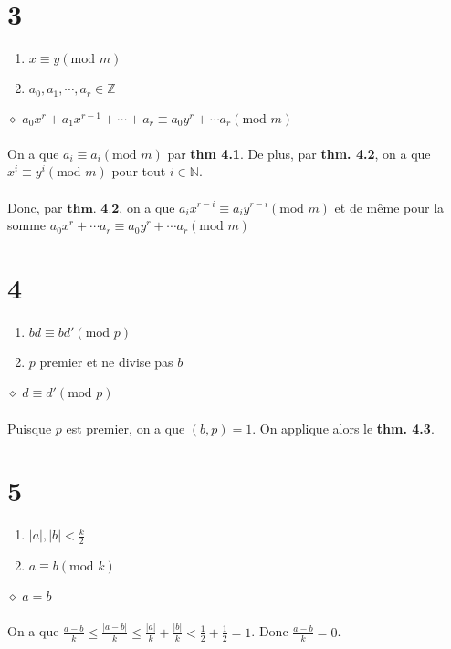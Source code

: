 \documentclass[a4paper,10pt]{article}
\begin{document}
\section*{3}
\begin{enumerate}
	\item $x \equiv y (\text{mod } m)$
	\item $a_0, a_1, \cdots, a_r \in \mathbb{Z}$
\end{enumerate}
$\diamond$ \textbf{$a_0x^r + a_1 x^{r-1} + \cdots + a_r \equiv a_0 y^r + \cdots a_r (\text{mod }m)$}
\\
\\
On a que $a_i \equiv a_i (\text{mod } m)$ par \textbf{thm 4.1}. De plus, par \textbf{thm. 4.2}, on a que $x^i \equiv y^i (\text{mod } m)$ pour tout $i \in \mathbb{N}$.
\\
\\
Donc, par $\textbf{thm. 4.2}$, on a que $a_i x^{r-i} \equiv a_i y^{r-i}(\text{mod } m )$ et de même pour la somme $a_0 x^r + \cdots a_r \equiv a_0 y^r + \cdots a_r (\text{mod }m)$

\section*{4}
\begin{enumerate}
	\item $bd \equiv bd' (\text{mod } p)$
	\item $p$ premier et ne divise pas $b$
\end{enumerate}
$\diamond$ \textbf{$d \equiv d' (\text{mod }p)$}
\\
\\
Puisque $p$ est premier, on a que $(b,p) = 1$. On applique alors le \textbf{thm. 4.3}.

\section*{5}
\begin{enumerate}
	\item $|a|, |b| < \frac{k}{2}$
	\item $a \equiv b(\text{mod } k)$
\end{enumerate}
$\diamond$ \textbf{$a = b$}
\\
\\
On a que $\frac{a-b}{k} \leq \frac{|a-b|}{k} \leq \frac{|a|}{k} + \frac{|b|}{k} < \frac{1}{2} + \frac{1}{2} = 1$. Donc $\frac{a-b}{k} = 0$.
\end{document}

